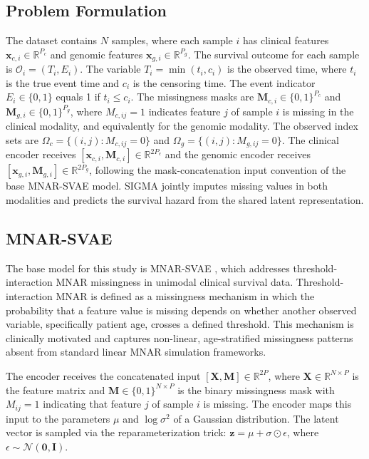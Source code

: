\documentclass[final,3p,times,authoryear]{elsarticle}
\begin{document}
\subsection{Problem Formulation}
The dataset contains $N$ samples, where each sample $i$ has clinical features $\mathbf{x}_{c,i} \in \mathbb{R}^{P_c}$ and genomic features $\mathbf{x}_{g,i} \in \mathbb{R}^{P_g}$. The survival outcome for each sample is $\mathcal{O}_i = (T_i, E_i)$. The variable $T_i = \min(t_i, c_i)$ is the observed time, where $t_i$ is the true event time and $c_i$ is the censoring time. The event indicator $E_i \in \{0, 1\}$ equals 1 if $t_i \leq c_i$. The missingness masks are $\mathbf{M}_{c,i} \in \{0,1\}^{P_c}$ and $\mathbf{M}_{g,i} \in \{0,1\}^{P_g}$, where $M_{c,ij} = 1$ indicates feature $j$ of sample $i$ is missing in the clinical modality, and equivalently for the genomic modality. The observed index sets are $\Omega_c = \{(i,j) : M_{c,ij} = 0\}$ and $\Omega_g = \{(i,j) : M_{g,ij} = 0\}$. The clinical encoder receives $[\mathbf{x}_{c,i}, \mathbf{M}_{c,i}] \in \mathbb{R}^{2P_c}$ and the genomic encoder receives $[\mathbf{x}_{g,i}, \mathbf{M}_{g,i}] \in \mathbb{R}^{2P_g}$, following the mask-concatenation input convention of the base MNAR-SVAE model. SIGMA jointly imputes missing values in both modalities and predicts the survival hazard from the shared latent representation.

\subsection{MNAR-SVAE}
The base model for this study is MNAR-SVAE \citep{mnarsvae}, which addresses threshold-interaction MNAR missingness in unimodal clinical survival data. Threshold-interaction MNAR is defined as a missingness mechanism in which the probability that a feature value is missing depends on whether another observed variable, specifically patient age, crosses a defined threshold. This mechanism is clinically motivated and captures non-linear, age-stratified missingness patterns absent from standard linear MNAR simulation frameworks.

The encoder receives the concatenated input $[\mathbf{X}, \mathbf{M}] \in \mathbb{R}^{2P}$, where $\mathbf{X} \in \mathbb{R}^{N \times P}$ is the feature matrix and $\mathbf{M} \in \{0,1\}^{N \times P}$ is the binary missingness mask with $M_{ij} = 1$ indicating that feature $j$ of sample $i$ is missing. The encoder maps this input to the parameters $\mu$ and $\log \sigma^2$ of a Gaussian distribution. The latent vector is sampled via the reparameterization trick: $\mathbf{z} = \mu + \sigma \odot \epsilon$, where $\epsilon \sim \mathcal{N}(\mathbf{0}, \mathbf{I})$.
\end{document}
